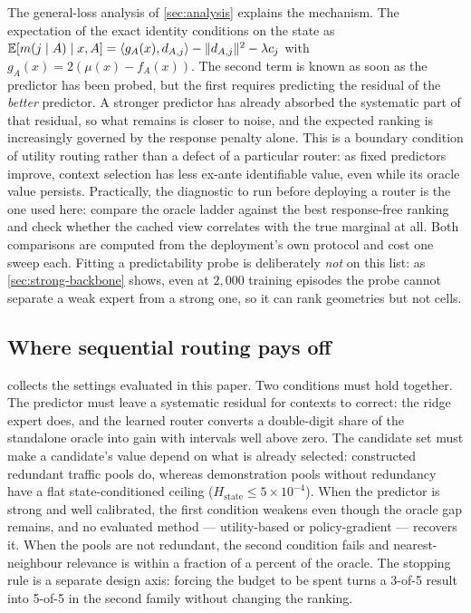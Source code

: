 The general-loss analysis of \cref{sec:analysis} explains the mechanism. The
expectation of the exact identity conditions on the state as
$\mathbb{E}[m(j\mid A)\mid x,A]=\langle g_A(x),d_{A,j}\rangle-\|d_{A,j}\|^2-\lambda
c_j$ with $g_A(x)=2(\mu(x)-f_A(x))$. The second term is known as soon as the
predictor has been probed, but the first requires predicting the residual of
the \emph{better} predictor. A stronger predictor has already absorbed the
systematic part of that residual, so what remains is closer to noise, and the
expected ranking is increasingly governed by the response penalty alone. This
is a boundary condition of utility routing rather than a defect of a particular
router: as fixed predictors improve, context selection has less ex-ante
identifiable value, even while its oracle value persists. Practically, the
diagnostic to run before deploying a router is the one used here: compare the
oracle ladder against the best response-free ranking and check whether the
cached view correlates with the true marginal at all. Both comparisons are
computed from the deployment's own protocol and cost one sweep each. Fitting a
predictability probe is deliberately \emph{not} on this list: as
\cref{sec:strong-backbone} shows, even at $2{,}000$ training episodes the probe
cannot separate a weak expert from a strong one, so it can rank geometries but
not cells.

\subsection{Where sequential routing pays off}

 collects the settings evaluated in this paper. Two
conditions must hold together. The predictor must leave a systematic residual
for contexts to correct: the ridge expert does, and the learned router converts
a double-digit share of the standalone oracle into gain with intervals well
above zero. The candidate set must make a candidate's value depend on what is
already selected: constructed redundant traffic pools do, whereas
demonstration pools without redundancy have a flat state-conditioned ceiling
($H_{\mathrm{state}}\le 5\times10^{-4}$). When the predictor is strong and
well calibrated, the first condition weakens even though the oracle gap
remains, and no evaluated method --- utility-based or policy-gradient ---
recovers it. When the pools are not redundant, the second condition fails and
nearest-neighbour relevance is within a fraction of a percent of the oracle.
The stopping rule is a separate design axis: forcing the budget to be spent
turns a 3-of-5 result into 5-of-5 in the second family without changing the
ranking.


